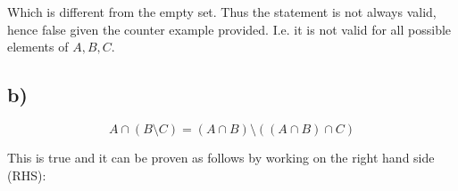 \documentclass[unicode,11pt,a4paper,oneside,numbers=endperiod,openany]{scrartcl}
\begin{document}
Which is different from the empty set. 
Thus the statement is not always valid, hence false given the counter example provided.
I.e. it is not valid for all possible elements of \( A, B, C \).

\subsection*{b)}

\[ 
    A \cap \left( B \setminus C \right)
    =
    \left( A \cap B \right) 
    \setminus 
    \left( 
        \left( A \cap B \right)
        \cap C 
    \right)
\]

This is true and it can be proven as follows by working on the right hand side (RHS):
\end{document}
